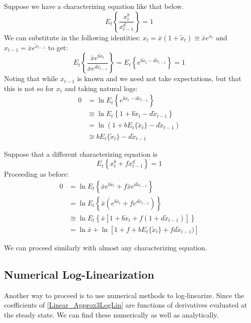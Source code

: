 \documentclass[letterpaper,12pt]{article}
\theoremstyle{definition}
\begin{document}
\begin{spacing}{1.5}
		Suppose we have a characterizing equation like that below.
		\begin{equation}
		E_t\left\{\frac{x_t^b}{x_{t-1}^d}\right\}=1 \nonumber
		\end{equation}
		We can substitute in the following identities: $x_t =\bar x (1+\tilde x_t) \cong \bar x e^{\tilde x_t}$ and $x_{t-1} = \bar x e^{\tilde x_{t-1}}$ to get:
		\begin{equation}
		E_t\left\{\frac{\bar x e^{b \tilde x_t}}{\bar x e^{d\tilde x_{t-1}}}\right\} = E_t\left\{ e^{b \tilde x_t-d\tilde x_{t-1}}\right\}= 1  \nonumber
		\end{equation}
		Noting that while $x_{t-1}$ is known and we need not take expectations, but that this is not so for $x_t$ and taking natural logs:
		\begin{equation}
		\begin{split}
		0 &= \ln E_t\left\{e^{b \tilde x_t -  d \tilde x_{t-1}}\right\} \\
		&\cong  \ln E_t\left\{1+b \tilde x_t-d\tilde x_{t-1}\right\} \\
		&=  \ln (1+b E_t\{\tilde x_t\}-d\tilde x_{t-1}) \\
		&\cong b E_t\{\tilde x_t\}-d\tilde x_{t-1}
		\nonumber
		\end{split}
		\end{equation}

		Suppose that a different characterizing equation is \begin{equation}
		E_t\left\{x_t^b + fx_{t-1}^d\right\}=1 \nonumber
		\end{equation}
		Proceeding as before:
		\begin{equation}
		\begin{split}
		0 &= \ln E_t\left\{\bar x e^{b \tilde x_t} + f \bar x e^{d \tilde x_{t-1}}\right\} \\
		&=\ln E_t\left\{\bar x (e^{b \tilde x_t} + f e^{d \tilde x_{t-1}})\right\} \\
		&\cong \ln E_t\left\{\bar x [1+b \tilde x_t+ f (1+d \tilde x_{t-1})]\right\} \\
		&= \ln \bar x +\ln [1+ f + b E_t\{\tilde x_t\}+ fd \tilde x_{t-1})]
		\nonumber
		\end{split}
		\end{equation}

		We can proceed similarly with almost any characterizing equation.

	\subsection{Numerical Log-Linearization}
		Another way to proceed is to use numerical methods to log-linearize. Since the coefficients of \eqref{Linear_Approx3LogLin} are functions of derivatives evaluated at the steady state. We can find these numerically as well as analytically.


\end{spacing}
\end{document}
